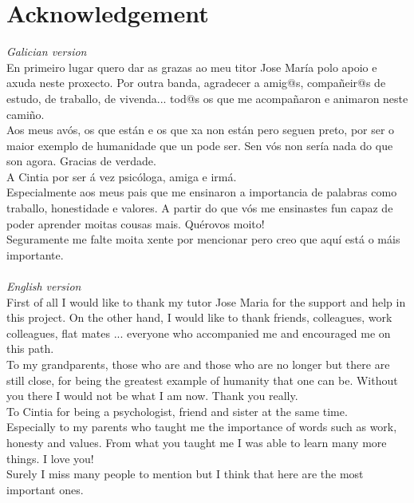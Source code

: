 \chapter*{Acknowledgement}
\textit{Galician version}\\
En primeiro lugar quero dar as grazas ao meu titor Jose María polo apoio e axuda neste proxecto. Por outra banda, agradecer a amig@s, compañeir@s de estudo, de traballo, de vivenda... tod@s os que me acompañaron e animaron neste camiño.\\
Aos meus avós, os que están e os que xa non están pero seguen preto, por ser o maior exemplo de humanidade que un pode ser. Sen vós non sería nada do que son agora. Gracias de verdade.\\
A Cintia por ser á vez psicóloga, amiga e irmá.\\
Especialmente aos meus pais que me ensinaron a importancia de palabras como traballo, honestidade e valores. A partir do que vós me ensinastes fun capaz de poder aprender moitas cousas mais. Quérovos moito!\\
Seguramente me falte moita xente por mencionar pero creo que aquí está o máis importante.\\ \ \\
\textit{English version}\\
First of all I would like to thank my tutor Jose Maria for the support and help in this project. On the other hand, I would like to thank friends, colleagues, work colleagues, flat mates ... everyone who accompanied me and encouraged me on this path. \\
To my grandparents, those who are and those who are no longer but there are still close, for being the greatest example of humanity that one can be. Without you there I would not be what I am now. Thank you really. \\
To Cintia for being a psychologist, friend and sister at the same time. \\
Especially to my parents who taught me the importance of words such as work, honesty and values. From what you taught me I was able to learn many more things. I love you! \\
Surely I miss many people to mention but I think that here are the most important ones.